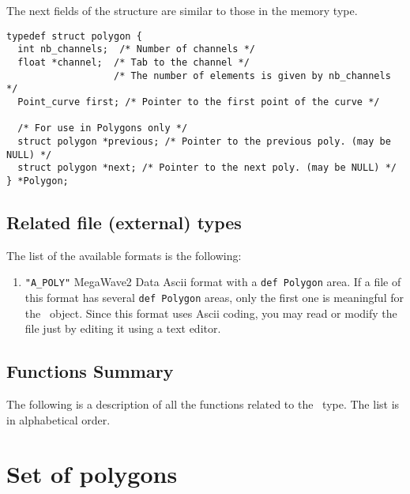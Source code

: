 The next fields of the structure are similar to those in the \curve memory 
type.

{\small
\begin{verbatim}
typedef struct polygon {
  int nb_channels;  /* Number of channels */
  float *channel;  /* Tab to the channel */
                   /* The number of elements is given by nb_channels */
  Point_curve first; /* Pointer to the first point of the curve */

  /* For use in Polygons only */
  struct polygon *previous; /* Pointer to the previous poly. (may be NULL) */
  struct polygon *next; /* Pointer to the next poly. (may be NULL) */
} *Polygon;
\end{verbatim}
}

\subsection{Related file (external) types}
\label{curves-polygons_polygon-file_type}

The list of the available formats is the following:
\begin{enumerate}
\item \verb+"A_POLY"+ MegaWave2 Data Ascii format with a \verb+def Polygon+ 
area. 
If a file of this format has several \verb+def Polygon+ areas, only the first one is meaningful for the \polygon\ object.
Since this format uses Ascii coding, you may read or modify the file just by
editing it using a text editor.
\end{enumerate}

\subsection{Functions Summary}
\label{curves-polygons_polygon_function}

The following is a description of all the functions related to 
the \polygon\ type. The list is in alphabetical order.

\newpage %



\section{Set of polygons}


